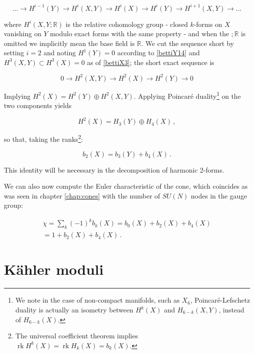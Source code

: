 \begin{equation}
	\ldots \rightarrow H^{i-1}(Y) \rightarrow H^{i}(X,Y) \rightarrow H^i(X) \rightarrow H^i(Y) \rightarrow H^{i+1}(X,Y) \rightarrow \ldots
\end{equation}

where $H^i(X,Y;\mathbb{R})$ is the relative cohomology group - closed $k$-forms on $X$ vanishing on $Y$ modulo exact forms with the same property - and when the $;\mathbb{R}$ is omitted we implicitly mean the base field is $\mathbb{R}$. We cut the sequence short by setting $i=2$ and noting $H^1(Y) = 0$ according to \eqref{bettiY14} and $H^3(X,Y) \subset H^3(X) = 0$ as of \eqref{bettiX3}; the short exact sequence is

\begin{equation}
	0 \rightarrow H^2(X,Y) \rightarrow H^2(X) \rightarrow H^2(Y) \rightarrow 0
\end{equation}

Implying $H^2(X) = H^2(Y) \oplus H^2(X,Y)$. Applying Poincaré duality\footnote{We note in the case of non-compact manifolds, such as $X_6$, Poincar\'e-Lefschetz duality is actually an isometry between $H^k(X)$ and $H_{6-k}(X,Y)$, instead of $H_{6-k}(X)$.} on the two components yields

\begin{equation}
	H^2(X) = H_3(Y) \oplus H_4(X)\,,
	\label{decomphomo}
\end{equation}

so that, taking the ranks\footnote{The universal coefficient theorem implies $\operatorname{rk}H^k(X) = \operatorname{rk}H_k(X) = b_k(X)$.}:

\begin{equation}
	b_2(X) = b_3(Y) + b_4(X) \,.\label{bettidentity}
\end{equation}

This identity will be necessary in the decomposition of harmonic 2-forms.

We can also now compute the Euler characteristic of the cone, which coincides as was seen in chapter \ref{chap:cones} with the number of $SU(N)$ nodes in the gauge group:

\begin{gather}
	\chi = \sum_k (-1)^k b_k(X) = b_0(X) + b_2(X) + b_4(X) \\= 1 + b_2(X) + b_4(X)\,.
	\label{}
\end{gather}

\section{K\"ahler moduli} \label{sec:heftkm}

